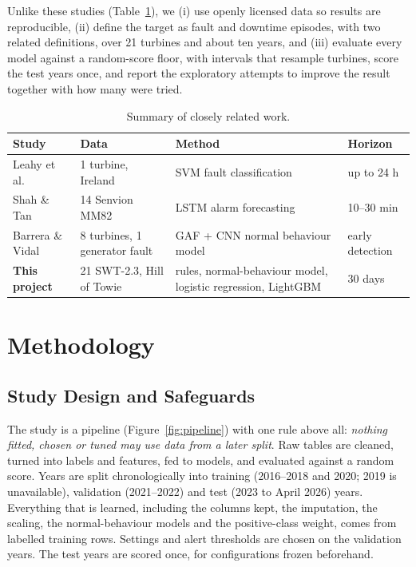 \documentclass[12pt,a4paper]{article}
\begin{document}
	Unlike these studies (Table~\ref{tab:related}), we (i) use openly licensed data so results are reproducible, (ii) define the target as fault and downtime episodes, with two related definitions, over 21 turbines and about ten years, and (iii) evaluate every model against a random-score floor, with intervals that resample turbines, score the test years once, and report the exploratory attempts to improve the result together with how many were tried.

	\begin{table}[htbp]
	\centering
	\small
	\begin{tabularx}{\linewidth}{@{}lXXl@{}}
	\toprule
	\textbf{Study} & \textbf{Data} & \textbf{Method} & \textbf{Horizon} \\
	\midrule
	Leahy et al.\ \cite{leahy2018} & 1 turbine, Ireland & SVM fault classification & up to 24 h \\
	Shah \& Tan \cite{shah2025} & 14 Senvion MM82 & LSTM alarm forecasting & 10--30 min \\
	Barrera \& Vidal \cite{barrera2026} & 8 turbines, 1 generator fault & GAF + CNN normal behaviour model & early detection \\
	\textbf{This project} & 21 SWT-2.3, Hill of Towie & rules, normal-behaviour model, logistic regression, LightGBM & 30 days \\
	\bottomrule
	\end{tabularx}
	\caption{Summary of closely related work.}
	\label{tab:related}
	\end{table}

	\section{Methodology}\label{sec:meth}

	\subsection{Study Design and Safeguards}\label{sec:design}
	The study is a pipeline (Figure~\ref{fig:pipeline}) with one rule above all: \emph{nothing fitted, chosen or tuned may use data from a later split}. Raw tables are cleaned, turned into labels and features, fed to models, and evaluated against a random score. Years are split chronologically into training (2016--2018 and 2020; 2019 is unavailable), validation (2021--2022) and test (2023 to April 2026) years. Everything that is learned, including the columns kept, the imputation, the scaling, the normal-behaviour models and the positive-class weight, comes from labelled training rows. Settings and alert thresholds are chosen on the validation years. The test years are scored once, for configurations frozen beforehand.
\end{document}
